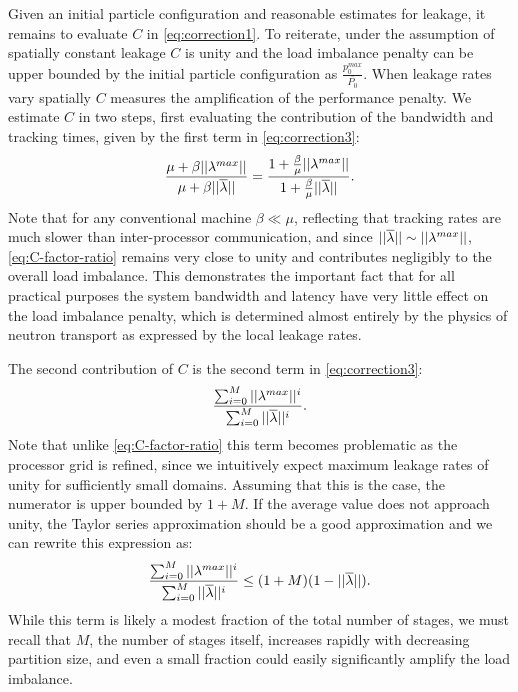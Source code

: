 Given an initial particle configuration and reasonable estimates for leakage, it
remains to evaluate $C$ in \eqref{eq:correction1}. To reiterate, under the
assumption of spatially constant leakage $C$ is unity and the load imbalance
penalty can be upper bounded by the initial particle configuration as
$\frac{p_0^{max}}{\overline{P_0}}$. When leakage rates vary spatially $C$
measures the amplification of the performance penalty. We estimate $C$ in two
steps, first evaluating the contribution of the bandwidth and tracking times,
given by the first term in \eqref{eq:correction3}:
\begin{equation}
  \label{eq:C-factor-ratio}
  \frac{\mu + \beta ||\lambda^{max}||}{\mu + \beta ||\overline{\lambda}||} = \frac{1 +
    \frac{\beta}{\mu}||\lambda^{max}||}{1 + \frac{\beta}{\mu}||\overline{\lambda}||}.
\end{equation}
Note that for any conventional machine $\beta \ll \mu$, reflecting that tracking
rates are much slower than inter-processor communication, and since $||\overline{\lambda}||
\sim ||\lambda^{max}||$, \eqref{eq:C-factor-ratio} remains very close to unity
and contributes negligibly to the overall load imbalance. This demonstrates the
important fact that for all practical purposes the system bandwidth and latency
have very little effect on the load imbalance penalty, which is determined
almost entirely by the physics of neutron transport as expressed by the local
leakage rates.

The second contribution of $C$ is the second term in \eqref{eq:correction3}:
\begin{equation*}
  \frac{\sum_{i=0}^M ||{\lambda^{max}}||^i}{\sum_{i=0}^M
    ||\overline{\lambda}||^i}.
\end{equation*}
Note that unlike \eqref{eq:C-factor-ratio} this term becomes problematic as the
processor grid is refined, since we intuitively expect maximum leakage rates of
unity for sufficiently small domains. Assuming that this is the case, the
numerator is upper bounded by $1+M$. If the average value does not approach
unity, the Taylor series approximation should be a good approximation and we can
rewrite this expression as:
\begin{equation*}
  \frac{\sum_{i=0}^M ||{\lambda^{max}}||^i}{\sum_{i=0}^M
    ||\overline{\lambda}||^i} \le (1+M)(1-||\overline{\lambda}||).
\end{equation*}
While this term is likely a modest fraction of the total number of stages, we
must recall that $M$, the number of stages itself, increases rapidly with
decreasing partition size, and even a small fraction could easily significantly
amplify the load imbalance.

